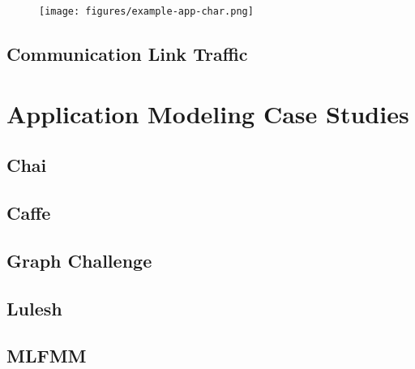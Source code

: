 \begin{figure}[ht]
    \centering
    \texttt{[image: figures/example-app-char.png]}
    \caption{}
    \label{fig:example-app-char}
\end{figure}


\subsection{Communication Link Traffic}



\section{Application Modeling Case Studies}
\subsection{Chai}
\subsection{Caffe}
\subsection{Graph Challenge}
\subsection{Lulesh}
\subsection{MLFMM}